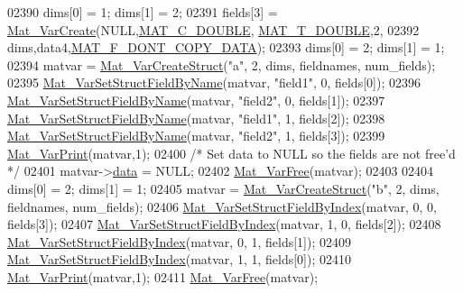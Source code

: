 \begin{DoxyCode}
{{{{{02390     dims[0] = 1; dims[1] = 2;
02391     fields[3] = \hyperlink{group___m_a_t_ga1c54a84bb4d810c6fccdb8869489eac4}{Mat\_VarCreate}(NULL,\hyperlink{group___m_a_t_ggad4d60ae7b709fc81bfd744fb4c857c40a5d70e0862e5bdb7bd86bf7ba5948f307}{MAT\_C\_DOUBLE},
      \hyperlink{group___m_a_t_ggacf7b3b879282b7ab3a51190e49bf3453a31e721ecf7e188196f83c32838288797}{MAT\_T\_DOUBLE},2,
02392                               dims,data4,\hyperlink{group___m_a_t_ggab9d6ef9e3ddca78a317b173f01d53fbba762244499f52eb35e7b53fb79a1f2889}{MAT\_F\_DONT\_COPY\_DATA});
02393     dims[0] = 2; dims[1] = 1;
02394     matvar = \hyperlink{group___m_a_t_gacecdb682a50977e54ecbdc54ed5c31bf}{Mat\_VarCreateStruct}(\textcolor{stringliteral}{"a"}, 2, dims, fieldnames, num\_fields);
02395     \hyperlink{group___m_a_t_ga702f2b853c605c94a8af50555fc7183b}{Mat\_VarSetStructFieldByName}(matvar, \textcolor{stringliteral}{"field1"}, 0, fields[0]);
02396     \hyperlink{group___m_a_t_ga702f2b853c605c94a8af50555fc7183b}{Mat\_VarSetStructFieldByName}(matvar, \textcolor{stringliteral}{"field2"}, 0, fields[1]);
02397     \hyperlink{group___m_a_t_ga702f2b853c605c94a8af50555fc7183b}{Mat\_VarSetStructFieldByName}(matvar, \textcolor{stringliteral}{"field1"}, 1, fields[2]);
02398     \hyperlink{group___m_a_t_ga702f2b853c605c94a8af50555fc7183b}{Mat\_VarSetStructFieldByName}(matvar, \textcolor{stringliteral}{"field2"}, 1, fields[3]);
02399     \hyperlink{group___m_a_t_ga9100c145e338b84b55d5d0795d5d390a}{Mat\_VarPrint}(matvar,1);
02400     \textcolor{comment}{/* Set data to NULL so the fields are not free'd */}
02401     matvar->\hyperlink{group___m_a_t_a5672978efa230bbdecdf38ede781f7fa}{data} = NULL;
02402     \hyperlink{group___m_a_t_ga1d14716f7450530fd1c9d02413787f0e}{Mat\_VarFree}(matvar);
02403 
02404     dims[0] = 2; dims[1] = 1;
02405     matvar = \hyperlink{group___m_a_t_gacecdb682a50977e54ecbdc54ed5c31bf}{Mat\_VarCreateStruct}(\textcolor{stringliteral}{"b"}, 2, dims, fieldnames, num\_fields);
02406     \hyperlink{group___m_a_t_ga3f077a005a8521c7a78927c1a1b4ae45}{Mat\_VarSetStructFieldByIndex}(matvar, 0, 0, fields[3]);
02407     \hyperlink{group___m_a_t_ga3f077a005a8521c7a78927c1a1b4ae45}{Mat\_VarSetStructFieldByIndex}(matvar, 1, 0, fields[2]);
02408     \hyperlink{group___m_a_t_ga3f077a005a8521c7a78927c1a1b4ae45}{Mat\_VarSetStructFieldByIndex}(matvar, 0, 1, fields[1]);
02409     \hyperlink{group___m_a_t_ga3f077a005a8521c7a78927c1a1b4ae45}{Mat\_VarSetStructFieldByIndex}(matvar, 1, 1, fields[0]);
02410     \hyperlink{group___m_a_t_ga9100c145e338b84b55d5d0795d5d390a}{Mat\_VarPrint}(matvar,1);
02411     \hyperlink{group___m_a_t_ga1d14716f7450530fd1c9d02413787f0e}{Mat\_VarFree}(matvar);
}}}}}
\end{DoxyCode}
